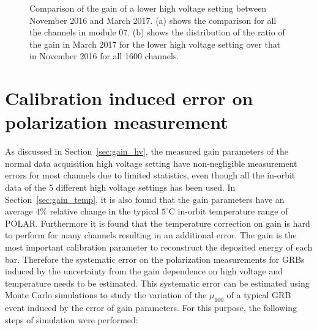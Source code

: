 \documentclass[preprint,sort&compress,12pt]{elsarticle}
\begin{document}
\begin{figure}[!ht]
\centering
{}
\hspace{2mm}
\caption{Comparison of the gain of a lower high voltage setting between November 2016 and March 2017. (a) shows the comparison for all the channels in module 07. (b) shows the distribution of the ratio of the gain in March 2017 for the lower high voltage setting over that in November 2016 for all 1600 channels.}\label{fig:gain_comp_Mar_Nov}
\end{figure}

\section{Calibration induced error on polarization measurement}\label{sec:calib_sys_error}

As discussed in Section~\ref{sec:gain_hv}, the measured gain parameters of the normal data acquisition high voltage setting have non-negligible measurement errors for most channels due to limited statistics, even though all the in-orbit data of the 5 different high voltage settings has been used. In Section~\ref{sec:gain_temp}, it is also found that the gain parameters have an average $4\%$ relative change in the typical $5^\circ\mathrm{C}$ in-orbit temperature range of POLAR. Furthermore it is found that the temperature correction on gain is hard to perform for many channels resulting in an additional error. The gain is the most important calibration parameter to reconstruct the deposited energy of each bar. Therefore the systematic error on the polarization measurements for GRBs induced by the uncertainty from the gain dependence on high voltage and temperature needs to be estimated. This systematic error can be estimated using Monte Carlo simulations to study the variation of the $\mu_{100}$ of a typical GRB event induced by the error of gain parameters. For this purpose, the following steps of simulation were performed:
\end{document}
